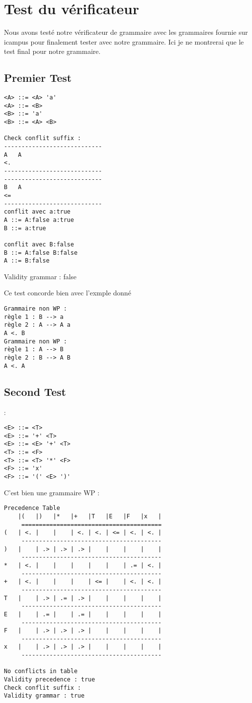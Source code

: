 \section{Test du vérificateur}
Nous avons testé notre vérificateur de grammaire avec les grammaires fournie sur icampus 
pour finalement tester avec notre grammaire. Ici je ne montrerai que le test final pour notre grammaire. 

\subsection{Premier Test}
{\tiny
\begin{verbatim}
<A> ::= <A> 'a'
<A> ::= <B>
<B> ::= 'a'
<B> ::= <A> <B>

Check conflit suffix : 
----------------------------
A   A
<.
----------------------------
----------------------------
B   A
<=
----------------------------
conflit avec a:true
A ::= A:false a:true
B ::= a:true 

conflit avec B:false
B ::= A:false B:false
A ::= B:false 
\end{verbatim}
}

Validity grammar : false


Ce test concorde bien avec l'exmple donné
{\tiny
\begin{verbatim}
Grammaire non WP :
règle 1 : B --> a 
règle 2 : A --> A a
A <. B
Grammaire non WP :
règle 1 : A --> B 
règle 2 : B --> A B
A <. A

\end{verbatim}
}


\subsection{Second Test}:
{\tiny
\begin{verbatim}
<E> ::= <T> 
<E> ::= '+' <T> 
<E> ::= <E> '+' <T> 
<T> ::= <F> 
<T> ::= <T> '*' <F> 
<F> ::= 'x' 
<F> ::= '(' <E> ')' 
\end{verbatim}
}
C'est bien une grammaire WP :
{\tiny
\begin{verbatim}
Precedence Table
    |(   |)   |*   |+   |T   |E   |F   |x   |
     ========================================
(   | <. |    |    | <. | <. | <= | <. | <. |
     ----------------------------------------
)   |    | .> | .> | .> |    |    |    |    |
     ----------------------------------------
*   | <. |    |    |    |    |    | .= | <. |
     ----------------------------------------
+   | <. |    |    |    | <= |    | <. | <. |
     ----------------------------------------
T   |    | .> | .= | .> |    |    |    |    |
     ----------------------------------------
E   |    | .= |    | .= |    |    |    |    |
     ----------------------------------------
F   |    | .> | .> | .> |    |    |    |    |
     ----------------------------------------
x   |    | .> | .> | .> |    |    |    |    |
     ----------------------------------------

No conflicts in table
Validity precedence : true
Check conflit suffix : 
Validity grammar : true
\end{verbatim}
}

